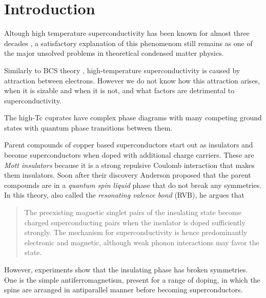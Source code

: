 \chapter{Introduction}
\label{chap:introduction}

Altough high temperature superconductivity has been known for almost three decades \cite{Bednorz1986}, a satisfactory explanation of this phenomenom still remains as one of the major unsolved problems in theoretical condensed matter physics. 

Similarly to BCS theory \cite{Bardeen1957}, high-temperature superconductivity is caused by attraction between electrons. However we do not know how this attraction arises, when it is sizable and when it is not, and what factors are detrimental to superconductivity.

The high-Tc cuprates have complex phase diagrams with many competing ground states with quantum phase transitions between them.\cite{Chakravarty2011}

Parent compounds of copper based superconductors start out as insulators and become superconductors when doped with additional charge carriers.
These are \textit{Mott insulators} because it is a strong repulsive Coulomb interaction that makes them insulators.
Soon after their discovery Anderson proposed \cite{Anderson1987} that the parent compounds are in a \textit{quantum spin liquid} phase that do not break any symmetries. 
In this theory, also called the \textit{resonating valence bond} (RVB), he argues that
\begin{quote}
The preexisting magnetic singlet pairs of the insulating state become charged superconducting pairs when the insulator is doped sufficiently strongly. The mechanism for superconductivity is hence predominantly electronic and magnetic, although weak phonon interactions may favor the state.
\end{quote} 

However, experiments show that the insulating phase has broken symmetries.
One is the simple antiferromagnetism, present for a range of doping, in which the spins are arranged in antiparallel manner before becoming superconductors. 

